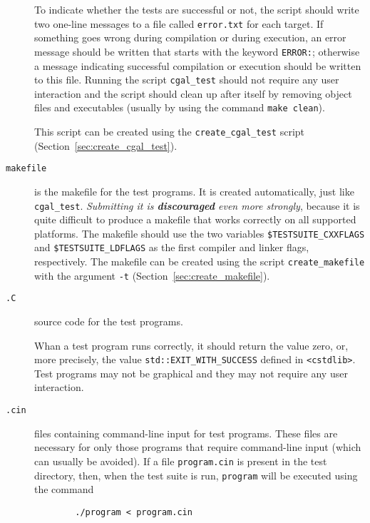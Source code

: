 \begin{description}
        To indicate whether the tests are successful or not, the script should 
        write two one-line messages to a file called {\tt error.txt}
        for each target. If something 
        goes wrong during compilation or during execution, an error message 
        should be written that starts with the keyword {\tt ERROR:}; otherwise
        a message indicating successful compilation or execution should be
        written to this file. Running the script {\tt cgal\_test} should not 
        require any user interaction and the script should clean up after 
        itself by removing object files and executables (usually by using the
        command {\tt make clean}).

        This script can be created using the 
        {\tt create\_cgal\_test}%
        script (Section~\ref{sec:create_cgal_test}).  

   \item[{\tt makefile}] 
        is the makefile for the test programs. It is created
        automatically, just like {\tt cgal\_test}. {\em Submitting it is 
        {\bf discouraged} even more strongly}, because it is quite difficult 
        to produce a makefile that works correctly on all supported platforms.
        The makefile should use
        the two variables \verb|$TESTSUITE_CXXFLAGS| 
        and \verb|$TESTSUITE_LDFLAGS| 
        as the first compiler and linker flags,
        respectively.  The makefile can be created using the script
        {\tt create\_makefile}%
        with the argument {\tt -t} 
        (Section~\ref{sec:create_makefile}).
   \item[{\tt *.C}] source code for the test programs.

        Whan a test program runs correctly, it should return
         the
        value zero, or, more precisely, the value \verb|std::EXIT_WITH_SUCCESS|
        defined in \verb|<cstdlib>|.
        Test programs may not be graphical and they may not require any user 
        interaction.   
   \item[{\tt *.cin}] files containing command-line input for 
        test programs.  These files are necessary for only those programs 
        that require command-line input (which can usually be avoided).  
        If a file \texttt{program.cin} is 
        present in the test directory, then, when the test suite is run,
        \texttt{program} will be executed using the command
        \begin{verbatim}
        ./program < program.cin
        \end{verbatim}
\end{description} 
